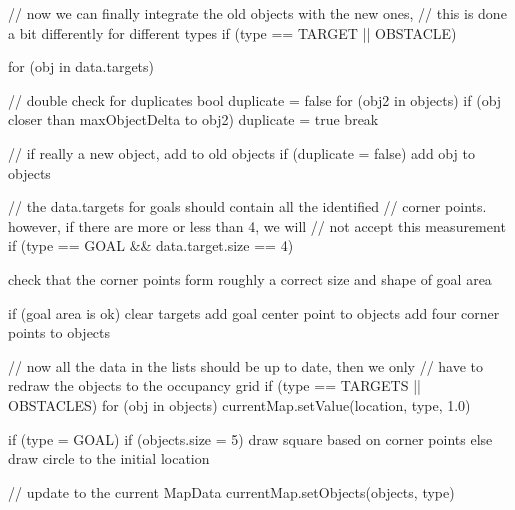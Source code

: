 \documentclass[a4paper,10pt]{article}
\begin{document}
\begin{appendices}
\begin{verbatimtab}
// now we can finally integrate the old objects with the new ones, 
// this is done a bit differently for different types
if (type == TARGET || OBSTACLE) {
	for (obj in data.targets) {
		
		// double check for duplicates
		bool duplicate = false
		for (obj2 in objects) {
			if (obj closer than maxObjectDelta to obj2) {
				duplicate = true
				break
			}
		}
		
		// if really a new object, add to old objects
		if (duplicate = false) {
			add obj to objects
		}
	}
}

// the data.targets for goals should contain all the identified 
// corner points. however, if there are more or less than 4, we will
// not accept this measurement
if (type == GOAL && data.target.size == 4) {
	check that the corner points form roughly a correct size and 
	shape of goal area
	
	if (goal area is ok) {
		clear targets
		add goal center point to objects
		add four corner points to objects
	}
}

// now all the data in the lists should be up to date, then we only 
// have to redraw the objects to the occupancy grid
if (type == TARGETS || OBSTACLES) {
	for (obj in objects) {
		currentMap.setValue(location, type, 1.0)
	}
}

if (type = GOAL) {
	if (objects.size = 5) {
		draw square based on corner points
	}
	else {
		draw circle to the initial location
	}
}

// update to the current MapData
currentMap.setObjects(objects, type)
\end{verbatimtab}


\end{appendices}
\end{document}
